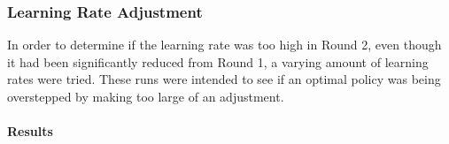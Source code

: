 
\subsubsection*{Learning Rate Adjustment}
\label{sec:findings-expts-learnrate}

In order to determine if the learning rate was too high in Round 2,
even though it had been significantly reduced from Round 1,
a varying amount of learning rates were tried.
%
These runs were intended to see if an optimal policy was being overstepped by
making too large of an adjustment.


\paragraph*{Results}

